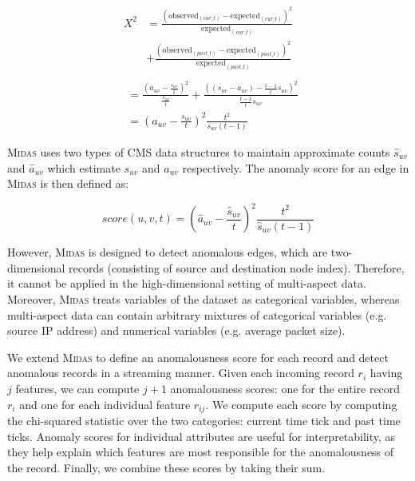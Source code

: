 \documentclass[sigconf]{acmart}
\begin{document}
\begin{align*}
X^2 &= \frac{(\text{observed}_{(cur\_t)} - \text{expected}_{(cur\_t)})^2}{\text{expected}_{(cur\_t)}} \\
&+ \frac{(\text{observed}_{(past\_t)} - \text{expected}_{(past\_t)})^2}{\text{expected}_{(past\_t)}}\\
\end{align*}
\begin{align*}
&= \frac{(a_{uv} - \frac{s_{uv}}{t})^2}{\frac{s_{uv}}{t}} + \frac{((s_{uv} - a_{uv}) - \frac{t-1}{t} s_{uv})^2}{\frac{t-1}{t} s_{uv}}\\
&= \left(a_{uv} - \frac{s_{uv}}{t}\right)^2 \frac{t^2}{s_{uv}(t-1)}
\end{align*}

\textsc{Midas} uses two types of CMS data structures to maintain approximate counts $\hat{s}_{uv}$ and $\hat{a}_{uv}$ which estimate $s_{uv}$ and $a_{uv}$ respectively. The anomaly score for an edge in \textsc{Midas} is then defined as:

\begin{equation}
score(u,v,t) = \left(\hat{a}_{uv} - \frac{\hat{s}_{uv}}{t}\right)^2 \label{eqn:eq1} \frac{t^2}{\hat{s}_{uv}(t-1)}
\end{equation}

However, \textsc{Midas} is designed to detect anomalous edges, which are two-dimensional records (consisting of source and destination node index).
Therefore, it cannot be applied in the high-dimensional setting of multi-aspect data. Moreover, \textsc{Midas} treats variables of the dataset as categorical variables, whereas multi-aspect data can contain arbitrary mixtures of categorical variables (e.g. source IP address) and numerical variables (e.g. average packet size).

We extend \textsc{Midas} to define an anomalousness score for each record and detect anomalous records in a streaming manner. Given each incoming record $r_{i}$ having $j$ features, we can compute $j+1$ anomalousness scores: one for the entire record $r_{i}$ and one for each individual feature $r_{ij}$. We compute each score by computing the chi-squared statistic over the two categories: current time tick and past time ticks. Anomaly scores for individual attributes are useful for interpretability, as they help explain which features are most responsible for the anomalousness of the record.
Finally, we combine these scores by taking their sum.
\end{document}
